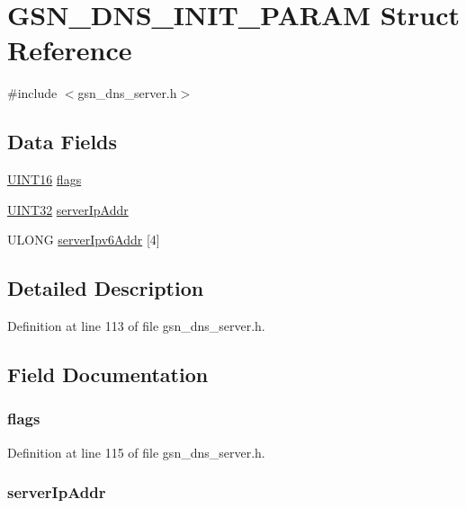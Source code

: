 \hypertarget{a00054}{
\section{GSN\_\-DNS\_\-INIT\_\-PARAM Struct Reference}
\label{a00054}
}


{\ttfamily \#include $<$gsn\_\-dns\_\-server.h$>$}

\subsection*{Data Fields}
\begin{DoxyCompactItemize}
\item 
\hyperlink{a00660_ga09f1a1fb2293e33483cc8d44aefb1eb1}{UINT16} \hyperlink{a00054_a3febe84123d486bfee9a4d615b421862}{flags}
\item 
\hyperlink{a00660_gae1e6edbbc26d6fbc71a90190d0266018}{UINT32} \hyperlink{a00054_a09261ac30de0001f89753c8f3869ad2f}{serverIpAddr}
\item 
ULONG \hyperlink{a00054_a7f1f7891e264201060f498798b450a8b}{serverIpv6Addr} \mbox{[}4\mbox{]}
\end{DoxyCompactItemize}


\subsection{Detailed Description}


Definition at line 113 of file gsn\_\-dns\_\-server.h.



\subsection{Field Documentation}
\hypertarget{a00054_a3febe84123d486bfee9a4d615b421862}{
\subsubsection[{flags}]{ {\bf flags}}}
\label{a00054_a3febe84123d486bfee9a4d615b421862}


Definition at line 115 of file gsn\_\-dns\_\-server.h.

\hypertarget{a00054_a09261ac30de0001f89753c8f3869ad2f}{
\subsubsection[{serverIpAddr}]{ {\bf serverIpAddr}}}
\label{a00054_a09261ac30de0001f89753c8f3869ad2f}


